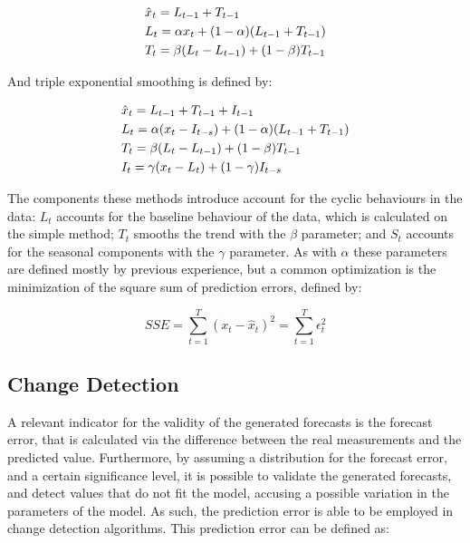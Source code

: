 \begin {equation*}
\centering
\begin {split}
&\hat{x}_t = L_{t-1} + T_{t-1} \\
&L_t = \alpha x_t + (1-\alpha)(L_{t-1} + T_{t-1}) \\
&T_t = \beta (L_t - L_{t-1}) + (1-\beta)T_{t-1}
\end {split}
\label{eq:exp_smooth}
\end {equation*}

\par And triple exponential smoothing is defined by:

\begin {equation*}
\centering
\begin {split}
&\hat{x}_t = L_{t-1} + T_{t-1} + I_{t-1}\\
&L_t = \alpha (x_t - I_{t-s}) + (1-\alpha)(L_{t-1} + T_{t-1}) \\
&T_t = \beta (L_t - L_{t-1}) + (1-\beta)T_{t-1} \\
&I_t = \gamma (x_t - L_t) + (1-\gamma)I_{t-s}
\end {split}
\label{eq:exp_smooth}
\end {equation*}

\par The components these methods introduce account for the cyclic behaviours in the data: $L_t$ accounts for the baseline behaviour of the data, which is calculated on the simple method; $T_t$ smooths the trend with the $\beta$ 
parameter; and $S_t$ accounts for the seasonal components with the $\gamma$ parameter. As with $\alpha$ these parameters are defined mostly by previous experience, but a common optimization is the minimization of the square sum 
of prediction errors, defined by:

\begin {equation*}
SSE = \sum_{t=1}^T{(x_t-\hat{x}_{t})^2} = \sum_{t=1}^T{\epsilon_t^2}
\end {equation*}

\subsection {Change Detection}

A relevant indicator for the validity of the generated forecasts is the forecast error, that is calculated via the difference between the real measurements and the predicted value. Furthermore, by assuming a distribution for 
the forecast error, and a certain significance level, it is possible to validate the generated forecasts, and detect values that do not fit the model, accusing a possible variation in the parameters of the model. As such,
the prediction error is able to be employed in change detection algorithms. This prediction error can be defined as:

